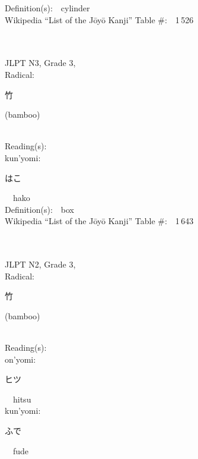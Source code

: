 \begin{multicols}{2}
Definition(s):\ \ cylinder \\
Wikipedia ``List of the J\=oy\=o Kanji'' Table \#:\ \ 1\,526 \\
\ \ \\
{\fontsize{34pt}{40pt}  }\ \ \\  %
{JLPT N3, Grade 3, \\Radical:\ \ {\begin{CJK}{UTF8}{min} 竹 \end{CJK}} (bamboo) } \\
Reading(s):\ \ \\
{\hspace*{1em}}kun'yomi:\ \ \\
{\hspace*{2em}}{\begin{CJK}{UTF8}{min} はこ \end{CJK}}\ \ hako\ \ \\
Definition(s):\ \ box \\
Wikipedia ``List of the J\=oy\=o Kanji'' Table \#:\ \ 1\,643 \\
\ \ \\
{\fontsize{34pt}{40pt}  }\ \ \\  %
{JLPT N2, Grade 3, \\Radical:\ \ {\begin{CJK}{UTF8}{min} 竹 \end{CJK}} (bamboo) } \\
Reading(s):\ \ \\
{\hspace*{1em}}on'yomi:\ \ \\
{\hspace*{2em}}{\begin{CJK}{UTF8}{min} ヒツ \end{CJK}}\ \ hitsu\ \ \\
{\hspace*{1em}}kun'yomi:\ \ \\
{\hspace*{2em}}{\begin{CJK}{UTF8}{min} ふで \end{CJK}}\ \ fude\ \ \\

\end{multicols}
